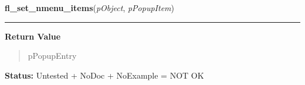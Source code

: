     \label{xformslib:library:fl_set_nmenu_items}

    \vspace{0.5ex}

\hspace{.8\funcindent}\begin{boxedminipage}{\funcwidth}

    \raggedright \textbf{fl\_set\_nmenu\_items}(\textit{pObject}, \textit{pPopupItem})

    \vspace{-1.5ex}

    \rule{\textwidth}{0.5\fboxrule}
\setlength{\parskip}{2ex}
\setlength{\parskip}{1ex}
      \textbf{Return Value}
    \vspace{-1ex}

      \begin{quote}
      pPopupEntry

      \end{quote}

\textbf{Status:} Untested + NoDoc + NoExample = NOT OK



    \end{boxedminipage}

    \label{xformslib:library:fl_add_nmenu_items2}

    \vspace{0.5ex}

